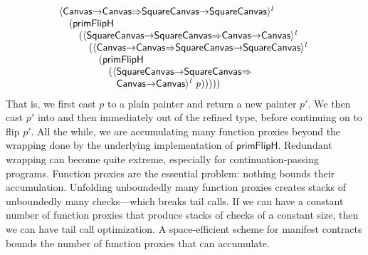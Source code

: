 \documentclass[9pt]{extarticle}
\newcommand{\ottnt}[1]{\mathit{#1}}
\begin{document}
\[\begin{array}{@{}l@{}}
   \langle    \mathsf{Canvas}  \mathord{ \rightarrow }  \mathsf{Canvas}    \mathord{ \overset{    }{\Rightarrow} }    \mathsf{SquareCanvas}  \mathord{ \rightarrow }  \mathsf{SquareCanvas}    \rangle^{ \ottnt{l} } ~  {} \\  \quad   (   \mathsf{primFlipH}  ~ {} \\  \qquad   (  \langle    \mathsf{SquareCanvas}  \mathord{ \rightarrow }  \mathsf{SquareCanvas}    \mathord{ \overset{    }{\Rightarrow} }    \mathsf{Canvas}  \mathord{ \rightarrow }  \mathsf{Canvas}    \rangle^{ \ottnt{l} } ~  {} \\  \qquad  \quad   (  \langle    \mathsf{Canvas}  \mathord{ \rightarrow }  \mathsf{Canvas}    \mathord{ \overset{    }{\Rightarrow} }    \mathsf{SquareCanvas}  \mathord{ \rightarrow }  \mathsf{SquareCanvas}    \rangle^{ \ottnt{l} } ~  {} \\  \qquad  \qquad   (   \mathsf{primFlipH}  ~ {} \\  \qquad  \qquad  \quad   (  \langle    \mathsf{SquareCanvas}  \mathord{ \rightarrow }  \mathsf{SquareCanvas}    \mathord{ \overset{    }{\Rightarrow} }   {} \\  \qquad  \qquad  \quad  \phantom{(}  \phantom{\langle}   \mathsf{Canvas}  \mathord{ \rightarrow }  \mathsf{Canvas}    \rangle^{ \ottnt{l} } ~  \mathit{p}  )   )   )   )   )  
\end{array}\]
That is, we first cast $\mathit{p}$ to a plain painter and return a new
painter $\mathit{p'}$. We then cast $\mathit{p'}$ into and then immediately out
of the refined type, before continuing on to flip $\mathit{p'}$.
All the while, we are accumulating many function proxies beyond the
wrapping done by the underlying implementation of $ \mathsf{primFlipH} $.
Redundant wrapping can become quite extreme, especially for
continuation-passing programs.
Function proxies are the essential problem: nothing bounds their
accumulation. Unfolding unboundedly many function proxies creates
stacks of unboundedly many checks---which breaks tail calls.
{\iffull If we can have a constant number of function proxies that
  produce stacks of checks of a constant size, then we can have tail
  call optimization. \fi}
A space-efficient scheme for manifest contracts bounds the number of
function proxies that can accumulate.

\end{document}
